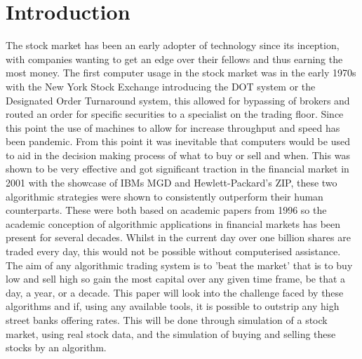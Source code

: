 \documentclass[12pt,a4paper]{article}
\begin{document}
\section{Introduction}

\iffalse
This section briefly introduces the general project background, the research question you are addressing, and the project objectives.  It should be between 2 to 3 pages in length.  Do not change the font sizes or line spacing in order to put in more text.

- Same as the aims just longer.\\
- What is the aim for a year?\\
- Objectives.\\
- What is the state of the art in the field?\\
- A bit of the history of trading.\\
\fi

The stock market has been an early adopter of technology since its inception, with companies wanting to get an edge over their fellows and thus earning the most money. The first computer usage in the stock market was in the early 1970s with the New York Stock Exchange introducing the DOT system or the Designated Order Turnaround system, this allowed for bypassing of brokers and routed an order for specific securities to a specialist on the trading floor. Since this point the use of machines to allow for increase throughput and speed has been pandemic. From this point it was inevitable that computers would be used to aid in the decision making process of what to buy or sell and when. This was shown to be very effective and got significant traction in the financial market in 2001 with the showcase of IBMs MGD and  Hewlett-Packard's ZIP, these two algorithmic strategies were shown to consistently outperform their human counterparts. These were both based on academic papers from 1996 so the academic conception of algorithmic applications in financial markets has been present for several decades. Whilst in the current day over one billion shares are traded every day, this would not be possible without computerised assistance. \\

The aim of any algorithmic trading system is to 'beat the market' that is to buy low and sell high so gain the most capital over any given time frame, be that a day, a year, or a decade. This paper will look into the challenge faced by these algorithms and if, using any available tools, it is possible to outstrip any high street banks offering rates. This will be done through simulation of a stock market, using real stock data, and the simulation of buying and selling these stocks by an algorithm.\\
\end{document}

